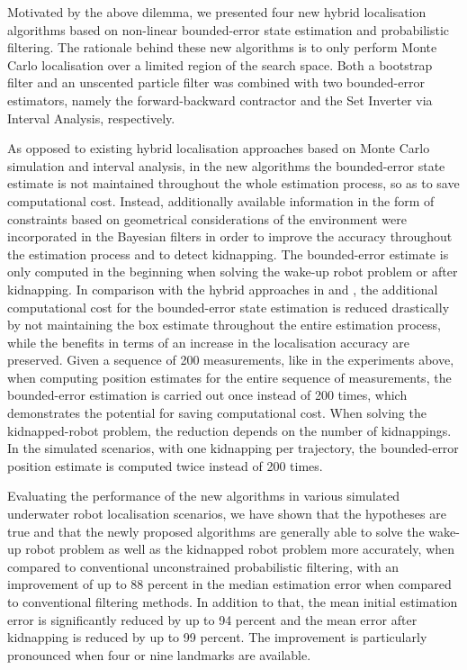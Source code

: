Motivated by the above dilemma, we presented four new hybrid localisation algorithms based on non-linear bounded-error state estimation and probabilistic filtering. The rationale behind these new algorithms is to only perform Monte Carlo localisation over a limited region of the search space. Both a bootstrap filter and an unscented particle filter was combined with two bounded-error estimators, namely the forward-backward contractor and the Set Inverter via Interval Analysis, respectively.

As opposed to existing hybrid localisation approaches based on Monte Carlo simulation and interval analysis, in the new algorithms the bounded-error state estimate is not maintained throughout the whole estimation process, so as to save computational cost. Instead, additionally available information in the form of constraints based on geometrical considerations of the environment were incorporated in the Bayesian filters in order to improve the accuracy throughout the estimation process and to detect kidnapping. The bounded-error estimate is only computed in the beginning when solving the wake-up robot problem or after kidnapping. %
 In comparison with the hybrid approaches in \cite{neulandh_ybridazation} and \cite{neuland_set_inversion}, the additional computational cost for the bounded-error state estimation is reduced drastically by not maintaining the box estimate throughout the entire estimation process, while the benefits in terms of an increase in the localisation accuracy are preserved. Given a sequence of 200 measurements, like in the experiments above, when computing position estimates for the entire sequence of measurements, the bounded-error estimation is carried out once instead of 200 times, which demonstrates the potential for saving computational cost. When solving the kidnapped-robot problem, the reduction depends on the number of kidnappings. In the simulated scenarios, with one kidnapping per trajectory, the bounded-error position estimate is computed twice instead of 200 times.
 


Evaluating the performance of the new algorithms in various simulated underwater robot localisation scenarios, we have shown that the hypotheses are true and that the newly proposed algorithms are generally able to solve the wake-up robot problem as well as the kidnapped robot problem more accurately, when compared to conventional unconstrained probabilistic filtering, with an improvement of up to 88 percent in the median estimation error when compared to conventional filtering methods. In addition to that, the mean initial estimation error is significantly reduced by up to 94 percent and the mean error after kidnapping is reduced by up to 99 percent. The improvement is particularly pronounced when four or nine landmarks are available.


